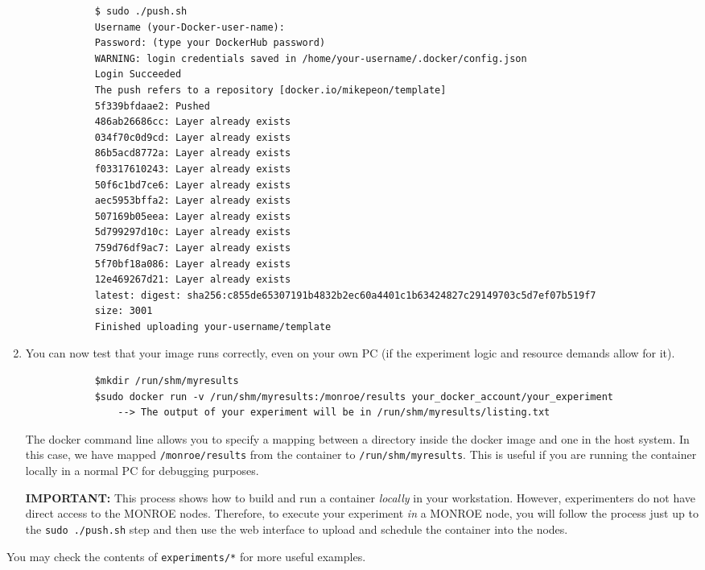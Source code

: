 \documentclass[a4paper,10pt]{article}
\newcommand{\VerbatimFont}{\footnotesize}
\newcommand{\monroe}{MONROE}
\newcommand{\identifier}[1]{{\texttt{\small{#1}}}}
\begin{document}
\begin{enumerate}
		{\VerbatimFont\begin{verbatim}
			$ sudo ./push.sh
			Username (your-Docker-user-name):
			Password: (type your DockerHub password)
			WARNING: login credentials saved in /home/your-username/.docker/config.json
			Login Succeeded
			The push refers to a repository [docker.io/mikepeon/template]
			5f339bfdaae2: Pushed
			486ab26686cc: Layer already exists
			034f70c0d9cd: Layer already exists
			86b5acd8772a: Layer already exists
			f03317610243: Layer already exists
			50f6c1bd7ce6: Layer already exists
			aec5953bffa2: Layer already exists
			507169b05eea: Layer already exists
			5d799297d10c: Layer already exists
			759d76df9ac7: Layer already exists
			5f70bf18a086: Layer already exists
			12e469267d21: Layer already exists
			latest: digest: sha256:c855de65307191b4832b2ec60a4401c1b63424827c29149703c5d7ef07b519f7
			size: 3001
			Finished uploading your-username/template
		\end{verbatim}}
	\item You can now test that your image runs correctly, even on your own PC (if the experiment logic and resource demands allow for it).
		{\VerbatimFont\begin{verbatim}
			$mkdir /run/shm/myresults
			$sudo docker run -v /run/shm/myresults:/monroe/results your_docker_account/your_experiment
			    --> The output of your experiment will be in /run/shm/myresults/listing.txt
		\end{verbatim}}
		The docker command line allows you to specify a mapping between a directory inside the docker image and one in the host system.
		In this case, we have mapped \identifier{/monroe/results} from the container to \identifier{/run/shm/my\-results}.
		This is useful if you are running the container locally in a normal PC for debugging purposes.
		
		\textbf{IMPORTANT:} This process shows how to build and run a container \emph{locally} in your workstation.
		However, experimenters do not have direct access to the \monroe{} nodes.
		Therefore, to execute your experiment \emph{in} a \monroe{} node, you will follow the process just up to the \identifier{sudo ./push.sh} step and then use the web interface to upload and schedule the container into the nodes.
\end{enumerate}

You may check the contents of \identifier{experiments/*} for more useful examples.
\end{document}
